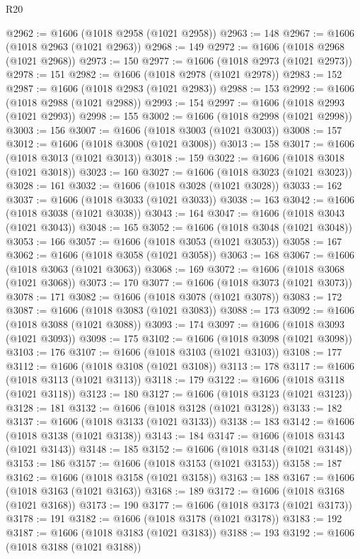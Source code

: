 \begin{lexlean}{R20}
\begin{coremodule}
@2962 := @1606 (@1018 @2958 (@1021 @2958))
@2963 := 148
@2967 := @1606 (@1018 @2963 (@1021 @2963))
@2968 := 149
@2972 := @1606 (@1018 @2968 (@1021 @2968))
@2973 := 150
@2977 := @1606 (@1018 @2973 (@1021 @2973))
@2978 := 151
@2982 := @1606 (@1018 @2978 (@1021 @2978))
@2983 := 152
@2987 := @1606 (@1018 @2983 (@1021 @2983))
@2988 := 153
@2992 := @1606 (@1018 @2988 (@1021 @2988))
@2993 := 154
@2997 := @1606 (@1018 @2993 (@1021 @2993))
@2998 := 155
@3002 := @1606 (@1018 @2998 (@1021 @2998))
@3003 := 156
@3007 := @1606 (@1018 @3003 (@1021 @3003))
@3008 := 157
@3012 := @1606 (@1018 @3008 (@1021 @3008))
@3013 := 158
@3017 := @1606 (@1018 @3013 (@1021 @3013))
@3018 := 159
@3022 := @1606 (@1018 @3018 (@1021 @3018))
@3023 := 160
@3027 := @1606 (@1018 @3023 (@1021 @3023))
@3028 := 161
@3032 := @1606 (@1018 @3028 (@1021 @3028))
@3033 := 162
@3037 := @1606 (@1018 @3033 (@1021 @3033))
@3038 := 163
@3042 := @1606 (@1018 @3038 (@1021 @3038))
@3043 := 164
@3047 := @1606 (@1018 @3043 (@1021 @3043))
@3048 := 165
@3052 := @1606 (@1018 @3048 (@1021 @3048))
@3053 := 166
@3057 := @1606 (@1018 @3053 (@1021 @3053))
@3058 := 167
@3062 := @1606 (@1018 @3058 (@1021 @3058))
@3063 := 168
@3067 := @1606 (@1018 @3063 (@1021 @3063))
@3068 := 169
@3072 := @1606 (@1018 @3068 (@1021 @3068))
@3073 := 170
@3077 := @1606 (@1018 @3073 (@1021 @3073))
@3078 := 171
@3082 := @1606 (@1018 @3078 (@1021 @3078))
@3083 := 172
@3087 := @1606 (@1018 @3083 (@1021 @3083))
@3088 := 173
@3092 := @1606 (@1018 @3088 (@1021 @3088))
@3093 := 174
@3097 := @1606 (@1018 @3093 (@1021 @3093))
@3098 := 175
@3102 := @1606 (@1018 @3098 (@1021 @3098))
@3103 := 176
@3107 := @1606 (@1018 @3103 (@1021 @3103))
@3108 := 177
@3112 := @1606 (@1018 @3108 (@1021 @3108))
@3113 := 178
@3117 := @1606 (@1018 @3113 (@1021 @3113))
@3118 := 179
@3122 := @1606 (@1018 @3118 (@1021 @3118))
@3123 := 180
@3127 := @1606 (@1018 @3123 (@1021 @3123))
@3128 := 181
@3132 := @1606 (@1018 @3128 (@1021 @3128))
@3133 := 182
@3137 := @1606 (@1018 @3133 (@1021 @3133))
@3138 := 183
@3142 := @1606 (@1018 @3138 (@1021 @3138))
@3143 := 184
@3147 := @1606 (@1018 @3143 (@1021 @3143))
@3148 := 185
@3152 := @1606 (@1018 @3148 (@1021 @3148))
@3153 := 186
@3157 := @1606 (@1018 @3153 (@1021 @3153))
@3158 := 187
@3162 := @1606 (@1018 @3158 (@1021 @3158))
@3163 := 188
@3167 := @1606 (@1018 @3163 (@1021 @3163))
@3168 := 189
@3172 := @1606 (@1018 @3168 (@1021 @3168))
@3173 := 190
@3177 := @1606 (@1018 @3173 (@1021 @3173))
@3178 := 191
@3182 := @1606 (@1018 @3178 (@1021 @3178))
@3183 := 192
@3187 := @1606 (@1018 @3183 (@1021 @3183))
@3188 := 193
@3192 := @1606 (@1018 @3188 (@1021 @3188))

\end{coremodule}
\end{lexlean}
